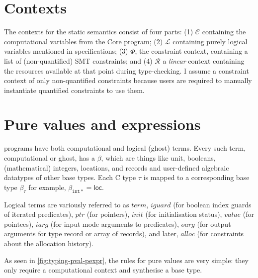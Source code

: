 \section{Contexts}

The contexts for the static semantics consist of four parts: (1) $\mathcal{C}$
containing the computational variables from the Core program; (2) $\mathcal{L}$
containing purely logical variables mentioned in specifications; (3) $\Phi$,
the constraint context, containing a list of (non-quantified) SMT constraints;
and (4) $\mathcal{R}$ a \emph{linear} context containing the resources
available at that point during type-checking. I assume a constraint context of
only non-quantified constraints because users are required to manually
instantiate quantified constraints to use them.

\section{Pure values and expressions}

 programs have both computational and logical (ghost) terms.
Every such term, computational or ghost, has a  $\beta$,
which are things like unit, booleans, (mathematical) integers, locations, and records and user-defined algebraic datatypes of
other base types. Each C type $\tau$ is mapped to a corresponding base type $\beta_\tau$
\textemdash{} for example, $\beta_{\mathtt{int*}} = \mathsf{loc}$.

Logical terms are variously referred to as ${term}$, ${iguard}$ (for boolean
index guards of iterated predicates), ${ptr}$ (for pointers), ${init}$ (for
initialisation status), ${value}$ (for pointees), ${iarg}$ (for input mode
arguments to predicates),  ${oarg}$ (for output arguments for type record or
array of records), and later, ${alloc}$ (for constraints about the allocation
history).

As seen in \cref{fig:typing-pval-pexpr}, the rules for pure
values are very simple: they only require a computational
context and synthesise a base type.

